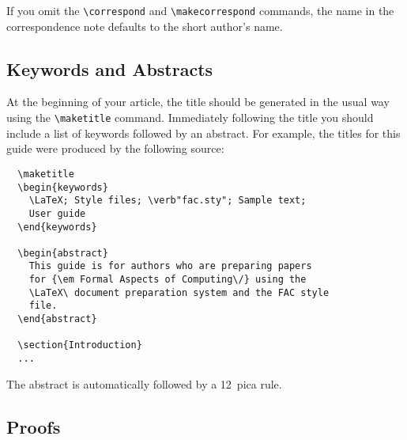 If you omit the \verb"\correspond" and \verb"\makecorrespond" commands,
the name in the correspondence note defaults to the short author's name.

\subsection{Keywords and Abstracts}

At the beginning of your article, the title should be generated in the
usual way using the \verb"\maketitle" command. Immediately following the
title you should include a list of keywords followed by an abstract. For
example, the titles for this guide were produced by the following source:
%
\begin{verbatim}
  \maketitle
  \begin{keywords}
    \LaTeX; Style files; \verb"fac.sty"; Sample text;
    User guide
  \end{keywords}

  \begin{abstract}
    This guide is for authors who are preparing papers
    for {\em Formal Aspects of Computing\/} using the
    \LaTeX\ document preparation system and the FAC style
    file.
  \end{abstract}

  \section{Introduction}
  ...
\end{verbatim}
The abstract is automatically followed by a 12~pica rule.

\subsection{Proofs}

